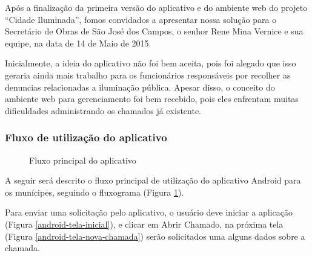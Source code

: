 \documentclass[
	article,			%
	11pt,				%
	oneside,			%
	a4paper,			%
	english,			%
	brazil,				%
	sumario=tradicional
	]{abntex2}
\begin{document}
Após a finalização da primeira versão do aplicativo e do ambiente web do projeto “Cidade Iluminada”, fomos convidados a apresentar nossa solução para o Secretário de Obras de São José dos Campos, o senhor Rene Mina Vernice e sua equipe, na data de 14 de Maio de 2015.

Inicialmente, a ideia do aplicativo não foi bem aceita, pois foi alegado que isso geraria ainda mais trabalho para os funcionários responsáveis por recolher as denuncias relacionadas a iluminação pública.
Apesar disso, o conceito do ambiente web para gerenciamento foi bem recebido, pois eles enfrentam muitas dificuldades administrando os chamados já existente.

\subsubsection{Fluxo de utilização do aplicativo}

\begin{figure}[!htbp]
 \centering
  \begin{minipage}{0.4\textwidth}
    \centering
    \caption{\label{android-fluxograma}Fluxo principal do aplicativo}
  \end{minipage}
\end{figure}

A seguir será descrito o fluxo principal de utilização do aplicativo Android para os munícipes, seguindo o fluxograma (Figura \ref{android-fluxograma}).

Para enviar uma solicitação pelo aplicativo, o usuário deve iniciar a aplicação (Figura \ref{android-tela-inicial}), e clicar em Abrir Chamado, na próxima tela (Figura \ref{android-tela-nova-chamada}) serão solicitados uma alguns dados sobre a chamada.
\end{document}
